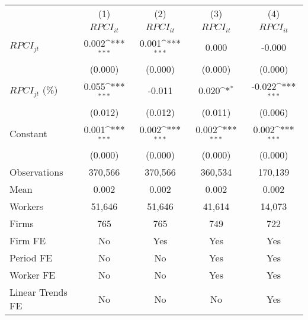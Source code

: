 {
\def\sym#1{\ifmmode^{#1}\else\(^{#1}\)\fi}
\begin{tabular}{l*{4}{c}}
\hline\hline
                    &\multicolumn{1}{c}{(1)}&\multicolumn{1}{c}{(2)}&\multicolumn{1}{c}{(3)}&\multicolumn{1}{c}{(4)}\\
                    &\multicolumn{1}{c}{$RPCI_{it}$}&\multicolumn{1}{c}{$RPCI_{it}$}&\multicolumn{1}{c}{$RPCI_{it}$}&\multicolumn{1}{c}{$RPCI_{it}$}\\
\hline
$RPCI_{jt}$         &       0.002\sym{***}&       0.001\sym{***}&       0.000         &      -0.000         \\
                    &     (0.000)         &     (0.000)         &     (0.000)         &     (0.000)         \\
[1em]
$RPCI_{jt}$ (\%)    &       0.055\sym{***}&      -0.011         &       0.020\sym{*}  &      -0.022\sym{***}\\
                    &     (0.012)         &     (0.012)         &     (0.011)         &     (0.006)         \\
[1em]
Constant            &       0.001\sym{***}&       0.002\sym{***}&       0.002\sym{***}&       0.002\sym{***}\\
                    &     (0.000)         &     (0.000)         &     (0.000)         &     (0.000)         \\
\hline
Observations        &     370,566         &     370,566         &     360,534         &     170,139         \\
Mean                &       0.002         &       0.002         &       0.002         &       0.002         \\
Workers             &      51,646         &      51,646         &      41,614         &      14,073         \\
Firms               &         765         &         765         &         749         &         722         \\
Firm FE             &          No         &         Yes         &         Yes         &         Yes         \\
Period FE           &          No         &          No         &         Yes         &         Yes         \\
Worker FE           &          No         &          No         &         Yes         &         Yes         \\
Linear Trends FE    &          No         &          No         &          No         &         Yes         \\
\hline\hline
\end{tabular}
}
